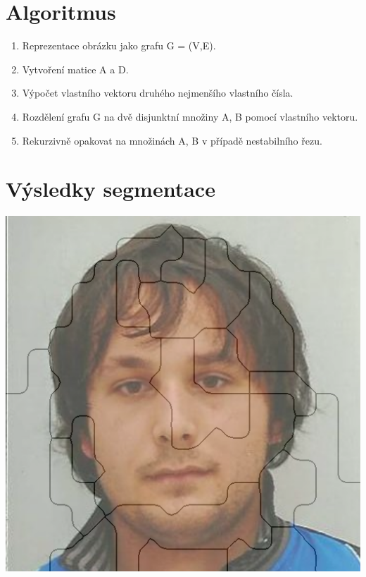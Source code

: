 \documentclass[11pt]{beamer}
\begin{document}
\section{Algoritmus}
\begin{frame}
\begin{enumerate}
\item Reprezentace obrázku jako grafu G = (V,E).
\item Vytvoření matice A a D.
\item Výpočet vlastního vektoru druhého nejmenšího vlastního čísla.
\item Rozdělení grafu G na dvě disjunktní množiny A, B pomocí vlastního vektoru.
\item Rekurzivně opakovat na množinách A, B v případě nestabilního řezu.
\end{enumerate}

\end{frame}
\section{Výsledky segmentace}
\begin{frame}
\begin{center}
\includegraphics[scale=0.40]{images/emb1_1_1.png}
\end{center}
\end{frame}
\end{document}
